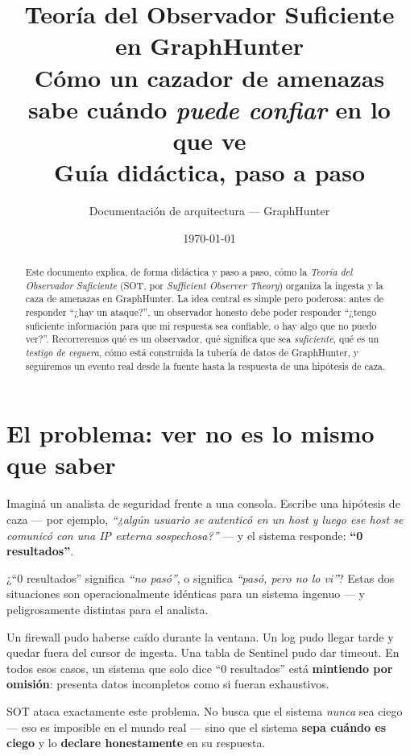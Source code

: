 \documentclass[11pt,a4paper]{article}
\title{\vspace{-1.5cm}
  {\color{ghblue}\Huge\bfseries Teoría del Observador Suficiente\\[2mm]
  \Large en GraphHunter}\\[4mm]
  {\color{ghgray}\large Cómo un cazador de amenazas sabe cuándo \emph{puede confiar} en lo que ve\\
  \normalsize Guía didáctica, paso a paso}}
\author{\color{ghgray}Documentación de arquitectura --- GraphHunter}
\date{\color{ghgray}\today}
\begin{document}
\maketitle
\thispagestyle{fancy}

\begin{abstract}
\noindent Este documento explica, de forma didáctica y paso a paso, cómo la
\emph{Teoría del Observador Suficiente} (SOT, por \emph{Sufficient Observer
Theory}) organiza la ingesta y la caza de amenazas en GraphHunter. La idea
central es simple pero poderosa: antes de responder ``¿hay un ataque?'', un
observador honesto debe poder responder ``¿tengo suficiente información para
que mi respuesta sea confiable, o hay algo que no puedo ver?''. Recorreremos
qué es un observador, qué significa que sea \emph{suficiente}, qué es un
\emph{testigo de ceguera}, cómo está construida la tubería de datos de
GraphHunter, y seguiremos un evento real desde la fuente hasta la respuesta de
una hipótesis de caza.
\end{abstract}

\tableofcontents
\vspace{4mm}

\section{El problema: ver no es lo mismo que saber}

Imaginá un analista de seguridad frente a una consola. Escribe una hipótesis
de caza --- por ejemplo, \emph{``¿algún usuario se autenticó en un host y luego
ese host se comunicó con una IP externa sospechosa?''} --- y el sistema
responde: \textbf{``0 resultados''}.

\begin{ideabox}
¿``0 resultados'' significa \emph{``no pasó''}, o significa \emph{``pasó, pero
no lo vi''}? Estas dos situaciones son operacionalmente idénticas para un
sistema ingenuo --- y peligrosamente distintas para el analista.
\end{ideabox}

Un firewall pudo haberse caído durante la ventana. Un log pudo llegar tarde y
quedar fuera del cursor de ingesta. Una tabla de Sentinel pudo dar timeout.
En todos esos casos, un sistema que solo dice ``0 resultados'' está
\textbf{mintiendo por omisión}: presenta datos incompletos como si fueran
exhaustivos.

SOT ataca exactamente este problema. No busca que el sistema \emph{nunca} sea
ciego --- eso es imposible en el mundo real --- sino que el sistema
\textbf{sepa cuándo es ciego} y lo \textbf{declare honestamente} en su
respuesta.
\end{document}
